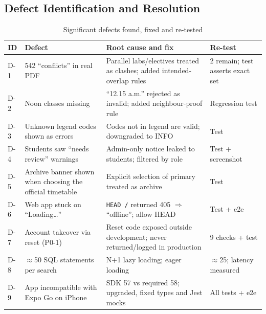 \subsection{Defect Identification and Resolution}
\begin{table}[H]
\centering
\caption{Significant defects found, fixed and re-tested}
\label{tab:defects}
\small
\begin{tabularx}{\textwidth}{@{}p{1cm}p{4cm}Xp{2.3cm}@{}}
\toprule
\textbf{ID} & \textbf{Defect} & \textbf{Root cause and fix} & \textbf{Re-test}\\
\midrule
D-1 & 542 ``conflicts'' in real PDF & Parallel labs/electives treated as clashes; added intended-overlap rules & 2 remain; test asserts exact set\\
D-2 & Noon classes missing & ``12.15 a.m.'' rejected as invalid; added neighbour-proof rule & Regression test\\
D-3 & Unknown legend codes shown as errors & Codes not in legend are valid; downgraded to INFO & Test\\
D-4 & Students saw ``needs review'' warnings & Admin-only notice leaked to students; filtered by role & Test + screenshot\\
D-5 & Archive banner shown when choosing the official timetable & Explicit selection of primary treated as archive & Test\\
D-6 & Web app stuck on ``Loading\ldots'' & \texttt{HEAD /} returned 405 $\Rightarrow$ ``offline''; allow HEAD & Test + e2e\\
D-7 & Account takeover via reset (P0-1) & Reset code exposed outside development; never returned/logged in production & 9 checks + test\\
D-8 & $\approx$50 SQL statements per search & N+1 lazy loading; eager loading & $\approx$25; latency measured\\
D-9 & App incompatible with Expo Go on iPhone & SDK 57 vs required 58; upgraded, fixed types and Jest mocks & All tests + e2e\\
\bottomrule
\end{tabularx}
\end{table}

